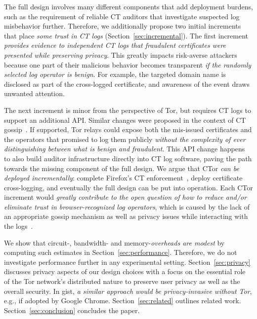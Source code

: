 The full design involves many different components that add deployment burdens,
such as the requirement of reliable CT auditors that investigate suspected log
misbehavior further.  Therefore, we additionally propose two initial increments
that place \emph{some trust in CT logs} (Section~\ref{sec:incremental}).  The
first increment \emph{provides evidence to independent CT logs that fraudulent
certificates were presented while preserving privacy}.  This greatly impacts
risk-averse attackers because one part of their malicious behavior becomes
transparent \emph{if the randomly selected log operator is benign}.  For
example, the targeted domain name is disclosed as part of the cross-logged
certificate, and awareness of the event draws unwanted attention.

The next increment is minor from the perspective of Tor, but requires CT logs to
support an additional API.  Similar changes were proposed in the context of CT
gossip~\cite{minimal-gossip}.  If supported, Tor relays could expose both the
mis-issued certificates and the operators that promised to log them publicly
\emph{without the complexity of ever distinguishing between what is benign and
fraudulent}.
This API change happens to also build auditor infrastructure
directly into CT log software, paving the path towards the missing component of
the full design.  We argue that CTor \emph{can be deployed incrementally}:
	complete Firefox's CT enforcement~\cite{ffct},
	deploy certificate cross-logging, and
	eventually the full design can be put into operation.
Each CTor increment would \emph{greatly contribute to the open question of how
to reduce and/or eliminate trust in browser-recognized log operators}, which is
caused by the lack of an appropriate gossip mechanism as well as privacy issues
while interacting with the logs~\cite{minimal-gossip,nordberg,ct-with-privacy}.

We show that circuit-, bandwidth- and memory-\emph{overheads are modest} by
computing such estimates in Section~\ref{sec:performance}.  Therefore, we do not
investigate performance further in any experimental setting.
Section~\ref{sec:privacy} discusses privacy aspects of our design choices with
a focus on the essential role of the Tor network's distributed nature to
preserve user privacy as well as the overall security.  In gist,
\emph{a similar approach would be privacy-invasive without Tor}, e.g., if
adopted by Google Chrome.  Section~\ref{sec:related} outlines related work.
Section~\ref{sec:conclusion} concludes the paper.
